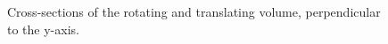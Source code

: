 \begin{figure}[htbp]
    \caption{Cross-sections of the rotating and translating volume, perpendicular to the y-axis.}
    \label{fig:cross_section_1rt}
  \end{figure}
  
